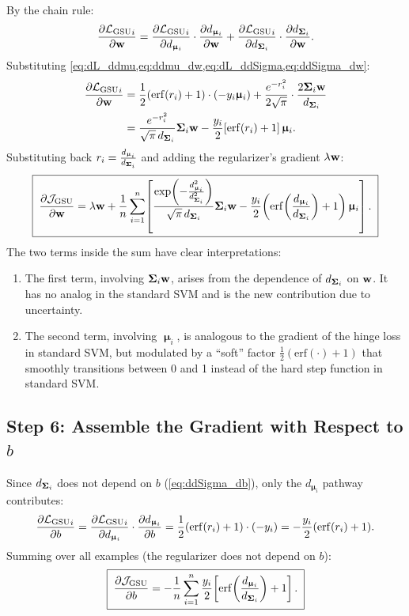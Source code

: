 \documentclass[11pt, letterpaper]{article}
\newcommand{\bSigma}{\vb{\Sigma}}
\newcommand{\bmu}{\boldsymbol{\upmu}}
\newcommand{\loss}{\mathcal{L}}
\newcommand{\obj}{\mathcal{J}}
\begin{document}
By the chain rule:
\begin{equation}
    \pdv{{\loss_{\text{GSU}}}_{i}}{\vb{w}} = \pdv{{\loss_{\text{GSU}}}_{i}}{d_{\bmu_i}}\cdot\pdv{d_{\bmu_i}}{\vb{w}} + \pdv{{\loss_{\text{GSU}}}_{i}}{d_{\bSigma_i}}\cdot\pdv{d_{\bSigma_i}}{\vb{w}}.
\end{equation}
Substituting \cref{eq:dL_ddmu,eq:ddmu_dw,eq:dL_ddSigma,eq:ddSigma_dw}:
\begin{align}
    \pdv{{\loss_{\text{GSU}}}_{i}}{\vb{w}} &= \frac{1}{2}(\mathrm{erf}(r_i) + 1)\cdot(-y_i\bmu_i) + \frac{e^{-r_i^2}}{2\sqrt{\pi}}\cdot\frac{2\bSigma_i\vb{w}}{d_{\bSigma_i}} \notag \\
    &= \frac{e^{-r_i^2}}{\sqrt{\pi}\, d_{\bSigma_i}}\bSigma_i\vb{w} - \frac{y_i}{2}\!\left[\mathrm{erf}(r_i) + 1\right]\bmu_i.
\end{align}
Substituting back $r_i = \frac{d_{\bmu_i}}{d_{\bSigma_i}}$ and adding the regularizer's gradient $\lambda\vb{w}$:
\begin{equation}\label{eq:gsu_grad_w}
    \boxed{\;\pdv{\obj_{\text{GSU}}}{\vb{w}} = \lambda\vb{w} + \frac{1}{n}\sum_{i=1}^{n}\!\left[\frac{\exp\!\left(-\frac{d_{\bmu_i}^2}{d_{\bSigma_i}^2}\right)}{\sqrt{\pi}\, d_{\bSigma_i}}\bSigma_i\vb{w} - \frac{y_i}{2}\!\left(\mathrm{erf}\!\left(\frac{d_{\bmu_i}}{d_{\bSigma_i}}\right) + 1\right)\bmu_i\right].\;}
\end{equation}
The two terms inside the sum have clear interpretations:
\begin{enumerate}[leftmargin=2em]
    \item The first term, involving $\bSigma_i\vb{w}$, arises from the dependence of $d_{\bSigma_i}$ on $\vb{w}$. It has no analog in the standard SVM and is the new contribution due to uncertainty.
    \item The second term, involving $\bmu_i$, is analogous to the gradient of the hinge loss in standard SVM, but modulated by a ``soft'' factor $\frac{1}{2}(\mathrm{erf}(\cdot) + 1)$ that smoothly transitions between 0 and 1 instead of the hard step function in standard SVM.
\end{enumerate}

\subsection{Step 6: Assemble the Gradient with Respect to $b$}

Since $d_{\bSigma_i}$ does not depend on $b$ (\cref{eq:ddSigma_db}), only the $d_{\bmu_i}$ pathway contributes:
\begin{equation}
    \pdv{{\loss_{\text{GSU}}}_{i}}{b} = \pdv{{\loss_{\text{GSU}}}_{i}}{d_{\bmu_i}}\cdot\pdv{d_{\bmu_i}}{b} = \frac{1}{2}(\mathrm{erf}(r_i) + 1)\cdot(-y_i) = -\frac{y_i}{2}(\mathrm{erf}(r_i) + 1).
\end{equation}
Summing over all examples (the regularizer does not depend on $b$):
\begin{equation}\label{eq:gsu_grad_b}
    \boxed{\;\pdv{\obj_{\text{GSU}}}{b} = -\frac{1}{n}\sum_{i=1}^{n}\frac{y_i}{2}\!\left[\mathrm{erf}\!\left(\frac{d_{\bmu_i}}{d_{\bSigma_i}}\right) + 1\right].\;}
\end{equation}
\end{document}
